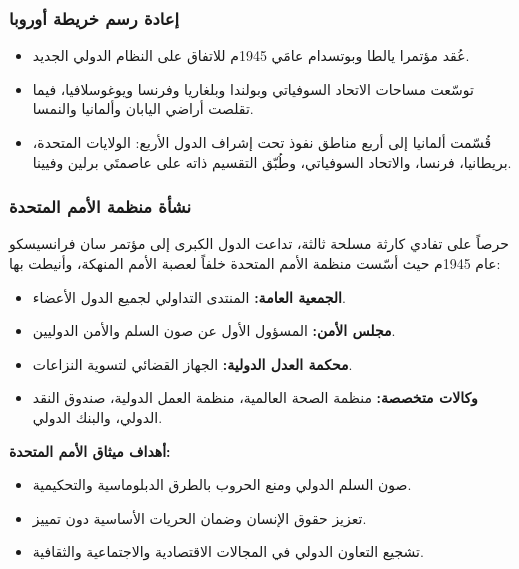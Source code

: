 \documentclass[12pt, a4paper]{article}
\begin{document}
\subsubsection{إعادة رسم خريطة أوروبا}
\begin{itemize}[leftmargin=*, itemsep=3pt]
  \item عُقد مؤتمرا يالطا وبوتسدام عامَي 1945م للاتفاق على النظام الدولي الجديد.
  \item توسّعت مساحات الاتحاد السوفياتي وبولندا وبلغاريا وفرنسا ويوغوسلافيا،
        فيما تقلصت أراضي اليابان وألمانيا والنمسا.
  \item قُسّمت ألمانيا إلى أربع مناطق نفوذ تحت إشراف الدول الأربع:
        الولايات المتحدة، بريطانيا، فرنسا، والاتحاد السوفياتي،
        وطُبّق التقسيم ذاته على عاصمتَي برلين وفيينا.
\end{itemize}

\subsubsection{نشأة منظمة الأمم المتحدة}
حرصاً على تفادي كارثة مسلحة ثالثة، تداعت الدول الكبرى إلى مؤتمر سان فرانسيسكو
عام 1945م حيث أسّست منظمة الأمم المتحدة خلفاً لعصبة الأمم المنهكة، وأنيطت بها:
\begin{itemize}[leftmargin=*, itemsep=2pt]
  \item \textbf{الجمعية العامة:} المنتدى التداولي لجميع الدول الأعضاء.
  \item \textbf{مجلس الأمن:} المسؤول الأول عن صون السلم والأمن الدوليين.
  \item \textbf{محكمة العدل الدولية:} الجهاز القضائي لتسوية النزاعات.
  \item \textbf{وكالات متخصصة:} منظمة الصحة العالمية، منظمة العمل الدولية،
        صندوق النقد الدولي، والبنك الدولي.
\end{itemize}

\begin{sidebarbox}
\textbf{أهداف ميثاق الأمم المتحدة:}
\begin{itemize}[leftmargin=*, nosep]
  \item صون السلم الدولي ومنع الحروب بالطرق الدبلوماسية والتحكيمية.
  \item تعزيز حقوق الإنسان وضمان الحريات الأساسية دون تمييز.
  \item تشجيع التعاون الدولي في المجالات الاقتصادية والاجتماعية والثقافية.
\end{itemize}
\end{sidebarbox}

\end{document}
